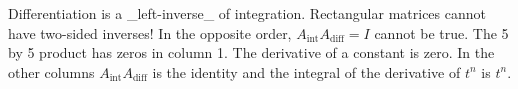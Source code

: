 Differentiation is a _left-inverse_ of integration. Rectangular matrices cannot have two-sided inverses! In the opposite order, \(A_{\text{int}}A_{\text{diff}}=I\) cannot be true. The 5 by 5 product has zeros in column 1. The derivative of a constant is zero. In the other columns \(A_{\text{int}}A_{\text{diff}}\) is the identity and the integral of the derivative of \(t^{n}\) is \(t^{n}\).

 